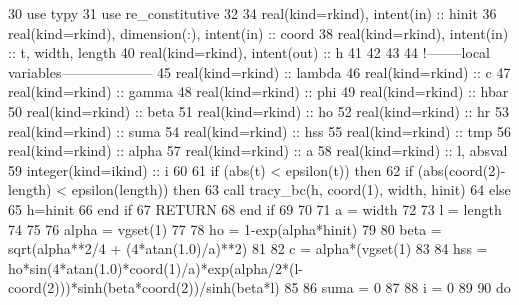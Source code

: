 \begin{DoxyCode}
30       \textcolor{keywordtype}{use }typy
31       \textcolor{keywordtype}{use }re_constitutive
32 
34       \textcolor{keywordtype}{real(kind=rkind)}, \textcolor{keywordtype}{intent(in)} :: hinit
36       \textcolor{keywordtype}{real(kind=rkind)}, \textcolor{keywordtype}{dimension(:)}, \textcolor{keywordtype}{intent(in)} :: coord
38       \textcolor{keywordtype}{real(kind=rkind)}, \textcolor{keywordtype}{intent(in)}               :: t, width, length
40       \textcolor{keywordtype}{real(kind=rkind)}, \textcolor{keywordtype}{intent(out)}              :: h
41 
42 
43 
44 \textcolor{comment}{!--------local variables--------------------}
45       \textcolor{keywordtype}{real(kind=rkind)} :: lambda
46       \textcolor{keywordtype}{real(kind=rkind)} :: c
47       \textcolor{keywordtype}{real(kind=rkind)} :: gamma
48       \textcolor{keywordtype}{real(kind=rkind)} :: phi
49       \textcolor{keywordtype}{real(kind=rkind)} :: hbar
50       \textcolor{keywordtype}{real(kind=rkind)} :: beta
51       \textcolor{keywordtype}{real(kind=rkind)} :: ho
52       \textcolor{keywordtype}{real(kind=rkind)} :: hr
53       \textcolor{keywordtype}{real(kind=rkind)} :: suma
54       \textcolor{keywordtype}{real(kind=rkind)} :: hss
55       \textcolor{keywordtype}{real(kind=rkind)} :: tmp
56       \textcolor{keywordtype}{real(kind=rkind)} :: alpha
57       \textcolor{keywordtype}{real(kind=rkind)} :: a
58       \textcolor{keywordtype}{real(kind=rkind)} :: l, absval
59       \textcolor{keywordtype}{integer(kind=ikind)} :: i
60       
61       \textcolor{keywordflow}{if} (abs(t) < epsilon(t)) \textcolor{keywordflow}{then}
62         \textcolor{keywordflow}{if} (abs(coord(2)-length) < epsilon(length)) \textcolor{keywordflow}{then}
63           \textcolor{keyword}{call }tracy\_bc(h, coord(1), width, hinit)
64         \textcolor{keywordflow}{else}
65           h=hinit
66 \textcolor{keywordflow}{        end if}
67         \textcolor{keywordflow}{RETURN}
68 \textcolor{keywordflow}{      end if}
69   
70 
71       a = width
72 
73       l = length
74 
75 
76       alpha = vgset(1)%
77 
78       ho = 1-exp(alpha*hinit)
79 
80       beta = sqrt(alpha**2/4 + (4*atan(1.0)/a)**2)
81 
82       c = alpha*(vgset(1)%
83 
84       hss = ho*sin(4*atan(1.0)*coord(1)/a)*exp(alpha/2*(l-coord(2)))*sinh\textcolor{comment}{(beta*coord(2))/sinh(beta*l)}
85 \textcolor{comment}{}
86 \textcolor{comment}{      suma = 0}
87 \textcolor{comment}{}
88 \textcolor{comment}{      i = 0}
89 \textcolor{comment}{}
90 \textcolor{comment}{      }\textcolor{keywordflow}{do}

\end{DoxyCode}
